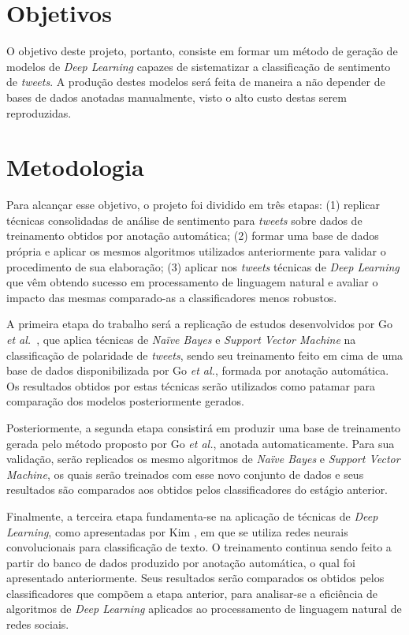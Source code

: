 \section{Objetivos}

O objetivo deste projeto, portanto, consiste em formar um método de geração de modelos de \textit{Deep Learning} capazes
de sistematizar a classificação de sentimento de \textit{tweets}.
A produção destes modelos será feita de maneira a não depender de bases de dados anotadas manualmente, visto o alto
custo destas serem reproduzidas.

\section{Metodologia}

Para alcançar esse objetivo, o projeto foi dividido em três etapas: (1) replicar técnicas consolidadas de análise de
sentimento para \textit{tweets} sobre dados de treinamento obtidos por anotação automática; (2) formar uma base de dados
própria e aplicar os mesmos algoritmos utilizados anteriormente para validar o procedimento de sua elaboração; (3)
aplicar nos \textit{tweets} técnicas de \textit{Deep Learning} que vêm obtendo sucesso em processamento de linguagem
natural e avaliar o impacto das mesmas comparado-as a classificadores menos robustos.

A primeira etapa do trabalho será a replicação de estudos desenvolvidos por Go \textit{et al.}~\cite{go09}, que aplica
técnicas de \textit{Naïve Bayes} e \textit{Support Vector Machine} na classificação de polaridade de \textit{tweets},
sendo seu treinamento feito em cima de uma base de dados disponibilizada por Go \textit{et al.}, formada por anotação
automática.
Os resultados obtidos por estas técnicas serão utilizados como patamar para comparação dos modelos posteriormente
gerados.

Posteriormente, a segunda etapa consistirá em produzir uma base de treinamento gerada pelo método proposto por Go
\textit{et al.}, anotada automaticamente.
Para sua validação, serão replicados os mesmo algoritmos de \textit{Naïve Bayes} e \textit{Support Vector Machine},
os quais serão treinados com esse novo conjunto de dados e seus resultados são comparados aos obtidos pelos
classificadores do estágio anterior.

Finalmente, a terceira etapa fundamenta-se na aplicação de técnicas de \textit{Deep Learning}, como apresentadas por
Kim \cite{kim14}, em que se utiliza redes neurais convolucionais para classificação de texto.
O treinamento continua sendo feito a partir do banco de dados produzido por anotação automática, o qual foi apresentado
anteriormente.
Seus resultados serão comparados os obtidos pelos classificadores que compõem a etapa anterior, para analisar-se a
eficiência de algoritmos de \textit{Deep Learning} aplicados ao processamento de linguagem natural de redes sociais.

